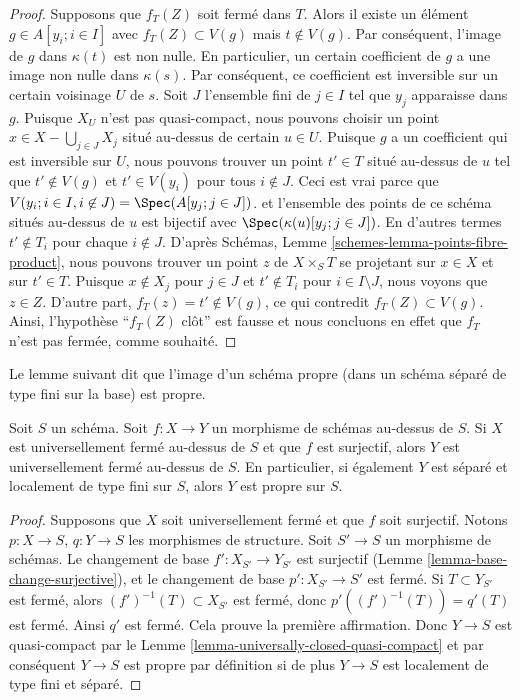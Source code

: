 \begin{proof}
\medskip\noindent Supposons
que $f_T(Z)$ soit fermé dans $T$. Alors il existe
un élément $g \in A[y_i; i \in I]$ avec $f_T(Z) \subset V(g)$ mais $t \not \in V(g)$. Par conséquent, l'image de
$g$ dans $\kappa(t)$ est non nulle. En particulier, un certain coefficient
de $g$ a une image non nulle dans $\kappa(s)$. Par conséquent, ce coefficient
est inversible sur un certain voisinage $U$ de $s$. Soit $J$
l'ensemble fini de $j \in I$ tel que $y_j$ apparaisse dans $g$.
Puisque $X_U$ n'est pas quasi-compact, nous pouvons choisir un point $x \in X - \bigcup_{j \in J} X_j$
situé au-dessus de certain $u \in U$. Puisque $g$ a un coefficient
qui est inversible sur $U$, nous pouvons trouver un point $t' \in T$
situé au-dessus de $u$ tel que $t' \not \in V(g)$ et $t' \in V(y_i)$
pour tous $i \notin J$. Ceci est vrai parce que $V(y_i; i \in I, i \not\in J) = \Spec(A[y_j; j\in J])$.
et l'ensemble des points de ce schéma situés au-dessus de $u$
est bijectif avec $\Spec(\kappa(u)[y_j; j \in J])$. En d'autres termes $t' \notin T_i$ pour
chaque $i \notin J$. D'après
Schémas, Lemme \ref{schemes-lemma-points-fibre-product}, nous pouvons trouver
un point $z$ de $X \times_S T$ se projetant sur $x \in X$ et sur
$t' \in T$. Puisque $x \not \in X_j$ pour $j \in J$ et $t' \not \in T_i$ pour $i \in I \setminus J$,
nous voyons que $z \in Z$. D'autre part, $f_T(z) = t' \not \in V(g)$,
ce qui contredit $f_T(Z) \subset V(g)$. Ainsi, l'hypothèse ``$f_T(Z)$
clôt'' est fausse et nous concluons en effet que $f_T$
n'est pas fermée, comme souhaité.
\end{proof}

\noindent
Le lemme suivant dit que l'image d'un schéma propre (dans un schéma séparé
de type fini sur la base) est propre.

\begin{lemma}
\label{lemma-image-proper-is-proper}
Soit $S$ un schéma. Soit $f : X \to Y$ un morphisme de schémas au-dessus de $S$. Si $X$ est
universellement fermé au-dessus de $S$ et que $f$ est surjectif, alors $Y$
est universellement fermé au-dessus de $S$. En particulier, si également $Y$ est séparé
et localement de type fini sur $S$, alors $Y$ est propre sur $S$.
\end{lemma}

\begin{proof}
Supposons que $X$ soit universellement fermé
et que $f$ soit surjectif. Notons $p : X \to S$,
$q : Y \to S$ les morphismes de structure. Soit $S' \to S$
un morphisme de schémas. Le changement
de base $f' : X_{S'} \to Y_{S'}$ est surjectif (Lemme \ref{lemma-base-change-surjective}),
et le changement de base $p' : X_{S'} \to S'$
est fermé. Si $T \subset Y_{S'}$ est fermé, alors $(f')^{-1}(T) \subset X_{S'}$
est fermé, donc $p'((f')^{-1}(T)) = q'(T)$ est fermé. Ainsi $q'$
est fermé. Cela prouve la première affirmation.
Donc $Y \to S$ est quasi-compact
par le Lemme \ref{lemma-universally-closed-quasi-compact} et par conséquent
$Y \to S$ est propre par définition
si de plus $Y \to S$ est localement de type fini et séparé.
\end{proof}

